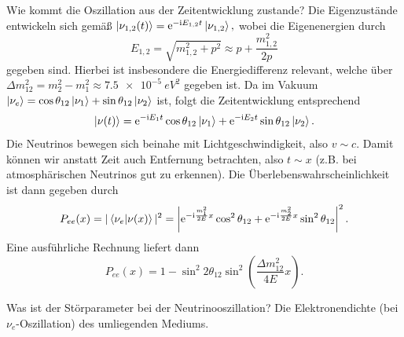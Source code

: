 \begin{fquestion}{Wie kommt die Oszillation aus der Zeitentwicklung zustande?}
    Die Eigenzustände entwickeln sich gemäß $\ket{\nu_{1,2}(t)} = \text{e}^{-\text{i} E_{1,2}t} \ket{\nu_{1,2}},$ wobei die Eigenenergien durch 
    $$E_{1,2} = \sqrt{m_{1,2}^2 + p^2} \approx p + \frac{m_{1,2}^2}{2p} $$
    gegeben sind.
    Hierbei ist insbesondere die Energiedifferenz relevant, welche über $\Delta m_{12}^2 = m_2^2 - m_1^2 \approx \SI{7.5e-5}{eV^2}$ gegeben ist.
    Da im Vakuum $\ket{\nu_e} = \cos\theta_{12}\ket{\nu_1} + \sin\theta_{12}\ket{\nu_2}$ ist, folgt die Zeitentwicklung entsprechend
    $$\ket{\nu(t)} = \text{e}^{-\text{i} E_{1}t} \cos\theta_{12}\ket{\nu_1} + \text{e}^{-\text{i} E_{2}t} \sin\theta_{12}\ket{\nu_2}.$$
    Die Neutrinos bewegen sich beinahe mit Lichtgeschwindigkeit, also  $v \sim c$.
    Damit können wir anstatt Zeit auch Entfernung betrachten, also $ t\sim x$ (z.B. bei atmosphärischen Neutrinos gut zu erkennen). 
    Die Überlebenswahrscheinlichkeit ist dann gegeben durch
    $$P_{ee}(x) = |\braket{\nu_e }{ \nu (x)}|^2 = \left\vert \text{e}^{-\text{i} \frac{m_1^2}{2E}x} \cos^2\theta_{12} + \text{e}^{-\text{i} \frac{m_2^2}{2E}x} \sin^2\theta_{12} \right\vert^2.$$
    Eine ausführliche Rechnung liefert dann
    $$P_{ee}(x) = 1 - \sin^2 2\theta_{12} \sin^2\left( \frac{\Delta m_{12}^2}{4E} x \right).$$
\end{fquestion}

\begin{fquestion}{Was ist der Störparameter bei der Neutrinooszillation?}
    Die Elektronendichte (bei $\nu_e$-Oszillation) des umliegenden Mediums.
\end{fquestion}

